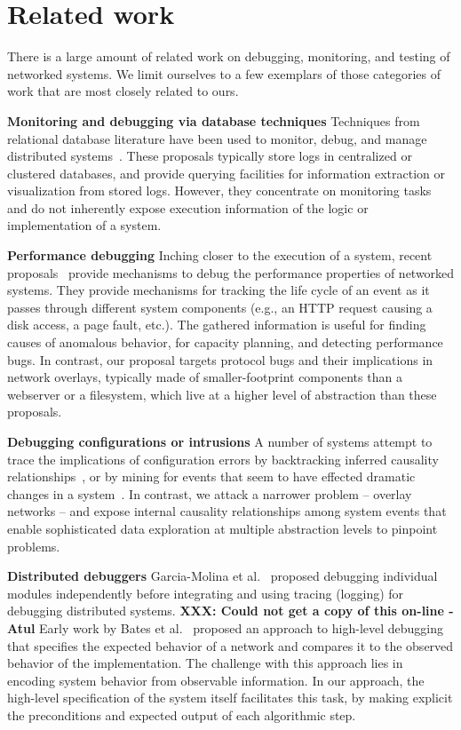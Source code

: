 \documentclass[10pt,twocolumn]{article}
\begin{document}
\section{Related work}
\label{sec:related}

There is a large amount of related work on debugging, monitoring, and testing of 
networked systems.  We limit ourselves to a few exemplars of those
categories of work that are most closely related to ours.

{\bf Monitoring and debugging via database techniques}
Techniques from relational database literature have been used to 
monitor, debug, and manage distributed systems~\cite{conradie-sdne,Hy+,snodgrass-tocs,wolfson-ieee91}.
These proposals typically store logs in centralized
or clustered databases, and provide querying facilities for
information extraction or visualization from stored logs.
However, they concentrate on monitoring tasks and do not inherently
expose execution information of the logic or
implementation of a system.

{\bf Performance debugging}
Inching closer to the execution of a system, recent
proposals~\cite{blackbox-sosp03,magpie-osdi04,causeway-hotos05,chen-path-04}
provide mechanisms to debug the performance properties of networked systems.
They provide mechanisms for tracking the life cycle of an event 
as it passes through different system components (e.g., 
an HTTP request causing a disk access, a page fault, etc.). The gathered information is 
useful for finding causes of anomalous behavior, for capacity 
planning, and detecting performance bugs. In contrast, our proposal
targets protocol bugs and their implications in network overlays,
typically made of smaller-footprint components than a webserver or a
filesystem, which live at a higher level of abstraction than these proposals.

{\bf Debugging configurations or intrusions}
A number of systems attempt to trace the implications of configuration
errors by backtracking inferred causality relationships~\cite{mahajan-sigcomm02,
wang-osdi04,King2003}, or by
mining for events that seem to have effected dramatic changes in a
system~\cite{chronus-osdi04}.  In contrast, we attack a narrower problem
-- overlay networks -- and expose internal causality
relationships among system events that enable sophisticated data
exploration at multiple abstraction levels to pinpoint problems.


{\bf Distributed debuggers}
Garcia-Molina et al.~\cite{molina-tose} proposed debugging individual modules
independently before integrating and using tracing (logging) for debugging 
distributed systems. {\bf XXX: Could not get a copy of this on-line - Atul}
\fi
Early work by Bates et al.~\cite{bates-83} proposed an approach to high-level debugging 
that specifies the expected behavior of a network and
compares it to the observed behavior of the implementation.  The
challenge with this approach lies in encoding system behavior from
observable information.  In our approach, the high-level specification
of the system itself facilitates this task, by making explicit
the preconditions and expected output of each algorithmic step.
\end{document}
